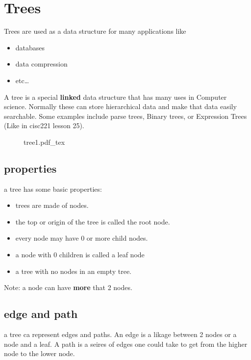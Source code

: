 \documentclass[12pt]{book}
\title{\coursetitle\linebreak\lecturename}
\author{\\Cain Susko\\ 
           \\ \\ \\
      Queen's University 
    \\School of Computing\\}
\newcommand{\incfig}[1]{%
    {#1.pdf_tex}
}
\begin{document}
\begin{titlepage}
        \maketitle
\end{titlepage}


\section*{Trees}
Trees are used as a data structure for many applications like
\begin{itemize}
        \item databases
        \item data compression
        \item etc\ldots
\end{itemize}

A tree is a special \textbf{linked} data structure that has many uses in Computer science.
Normally these can store hierarchical data and make that data easily searchable.
Some examples include parse trees, Binary trees, or Expression Trees (Like in cisc221 lesson 25).
\begin{figure}[h]
        \centering
        \incfig{tree1}
\end{figure}

\subsection*{properties}
a tree has some basic properties:
\begin{itemize}
        \item trees are made of nodes.
        \item the top or origin of the tree is called the root node.
        \item every node may have 0 or more child nodes.
        \item a node with 0 children is called a leaf node
        \item a tree with no nodes in an empty tree.
\end{itemize}

Note: a node can have \textbf{more} that 2 nodes.

\subsection*{edge and path}
a tree ca represent edges and paths.
An edge is a likage between 2 nodes or a node and a leaf. A path is a seires of edges one could take to get from the higher node to the
        lower node.
\end{document}
